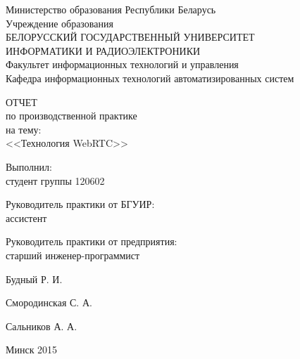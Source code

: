 \begin{titlepage}
\thispagestyle{empty}
\setlength{\parindent}{0mm} %

\begin{center}
  Министерство образования Республики Беларусь \\
  \smallskip
  Учреждение образования \\
  БЕЛОРУССКИЙ ГОСУДАРСТВЕННЫЙ УНИВЕРСИТЕТ \\
  ИНФОРМАТИКИ И РАДИОЭЛЕКТРОНИКИ \\
  \smallskip
  Факультет информационных технологий и управления \\
  \smallskip
  Кафедра информационных технологий автоматизированных систем
\end{center}

\vspace{40mm}

\begin{center}
  ОТЧЕТ \\
  по производственной практике \\
  на тему: \\
  <<Технология WebRTC>>
\end{center}

\vspace{30mm}

\begin{minipage}{.65\linewidth}
    Выполнил: \\
    студент группы 120602 

    \bigskip

    Руководитель практики от БГУИР: \\
    ассистент

    \bigskip

    Руководитель практики от предприятия: \\
    старший инженер-программист
    
\end{minipage}
\hfill
\begin{minipage}{.3\linewidth}
  \vspace{6mm}
  Будный Р. И.

  \vspace{12mm}
  Смородинская С. А.

  \vspace{12mm}
  Сальников А. А.
\end{minipage}

\vspace{40mm}
\begin{center}
  Минск 2015
\end{center}

\setlength{\parindent}{5ex} %
\end{titlepage}